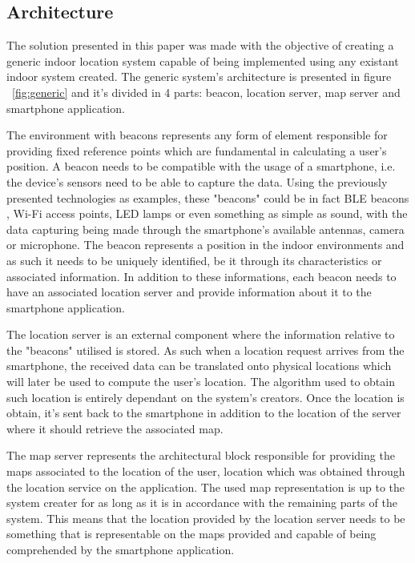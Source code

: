 \documentclass[a4paper]{IEEEtran}
\begin{document}
\subsection{Architecture}
\label{subsec:architecture}

The solution presented in this paper was made with the objective of creating a generic indoor location system capable of being implemented using any existant indoor system created. The generic system's architecture is presented in figure ~\ref{fig:generic} and it's divided in 4 parts: beacon, location server, map server and smartphone application. 

The environment with beacons represents any form of element responsible for providing fixed reference points which are fundamental in calculating a user's position. A beacon needs to be compatible with the usage of a smartphone, i.e. the device's sensors need to be able to capture the data. Using the previously presented technologies as examples, these "beacons" could be in fact BLE beacons , Wi-Fi access points, LED lamps or even something as simple as sound, with the data capturing being made through the smartphone's available antennas, camera or microphone. The beacon represents a position in the indoor environments and as such it needs to be uniquely identified, be it through its characteristics or associated information. In addition to these informations, each beacon needs to have an associated location server and provide information about it to the smartphone application.

The location server is an external component where the information relative to the "beacons" utilised is stored. As such when a location request arrives from the smartphone, the received data can be translated onto physical locations which will later be used to compute the user's location. The algorithm used to obtain such location is entirely dependant on the system's creators. Once the location is obtain, it's sent back to the smartphone in addition to the location of the server where it should retrieve the associated map.

The map server represents the architectural block responsible for providing the maps associated to the location of the user, location which was obtained through the location service on the application. The used map representation is up to the system creater for as long as it is in accordance with the remaining parts of the system. This means that the location provided by the location server needs to be something that is representable on the maps provided and capable of being comprehended by the smartphone application. 
\end{document}

